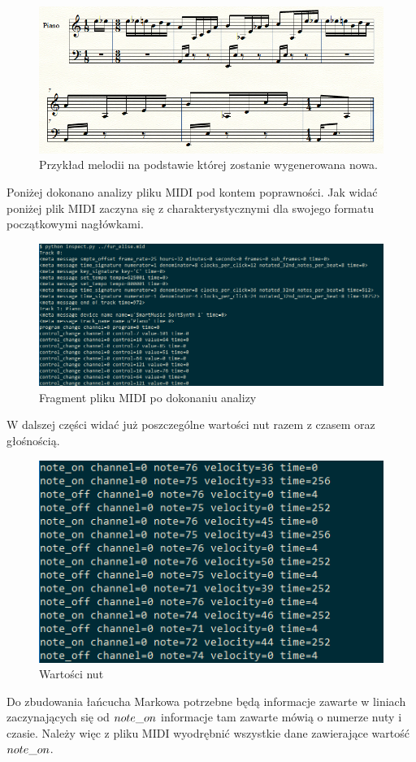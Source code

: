 \begin{figure}[H]
	\centering
	\includegraphics[width=0.7\linewidth]{przyklad_markov}
	\caption{Przykład melodii na podstawie której zostanie wygenerowana nowa.}
	\label{fig:przykladmarkov}
\end{figure}

Poniżej dokonano analizy pliku MIDI pod kontem poprawności. Jak widać poniżej plik MIDI zaczyna się z charakterystycznymi dla swojego formatu początkowymi nagłówkami.

\begin{figure}[H]
	\centering
	\includegraphics[width=0.5\linewidth]{analiza_midi}
	\caption{Fragment pliku MIDI po dokonaniu analizy}
	\label{fig:analizamidi}
\end{figure}

W dalszej części widać już poszczególne wartości nut razem z czasem oraz głośnością. 

\begin{figure}[H]
	\centering
	\includegraphics[width=0.5\linewidth]{nuty}
	\caption{Wartości nut}
	\label{fig:nuty}
\end{figure}


Do zbudowania łańcucha Markowa potrzebne będą informacje zawarte w liniach zaczynających się od $\mathnormal{note\_on}$ informacje tam zawarte mówią o numerze nuty i czasie. Należy więc z pliku MIDI wyodrębnić wszystkie dane zawierające wartość $\mathnormal{note\_on}$.


